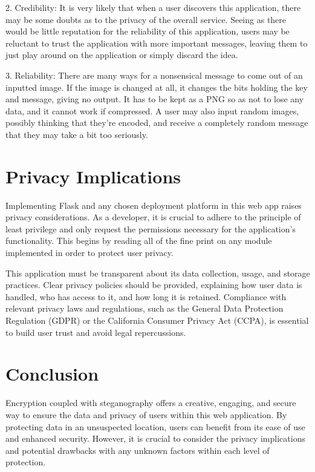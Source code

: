\documentclass[conference]{IEEEtran}
\begin{document}
2. Credibility: It is very likely that when a user discovers this application, there may be some doubts as to the privacy of the overall service. Seeing as there would be little reputation for the reliability of this application, users may be reluctant to trust the application with more important messages, leaving them to just play around on the application or simply discard the idea.

3. Reliability: There are many ways for a nonsensical message to come out of an inputted image. If the image is changed at all, it changes the bits holding the key and message, giving no output. It has to be kept as a PNG so as not to lose any data, and it cannot work if compressed. A user may also input random images, possibly thinking that they’re encoded, and receive a completely random message that they may take a bit too seriously.


\section{Privacy Implications}
Implementing Flask and any chosen deployment platform in this web app raises privacy considerations. As a developer, it is crucial to adhere to the principle of least privilege and only request the permissions necessary for the application's functionality. This begins by reading all of the fine print on any module implemented in order to protect user privacy.

This application must be transparent about its data collection, usage, and storage practices. Clear privacy policies should be provided, explaining how user data is handled, who has access to it, and how long it is retained. Compliance with relevant privacy laws and regulations, such as the General Data Protection Regulation (GDPR) or the California Consumer Privacy Act (CCPA), is essential to build user trust and avoid legal repercussions.


\section{Conclusion}
Encryption coupled with steganography offers a creative, engaging, and secure way to ensure the data and privacy of users within this web application. By protecting data in an unsuspected location, users can benefit from its ease of use and enhanced security. However, it is crucial to consider the privacy implications and potential drawbacks with any unknown factors within each level of protection.
\end{document}
